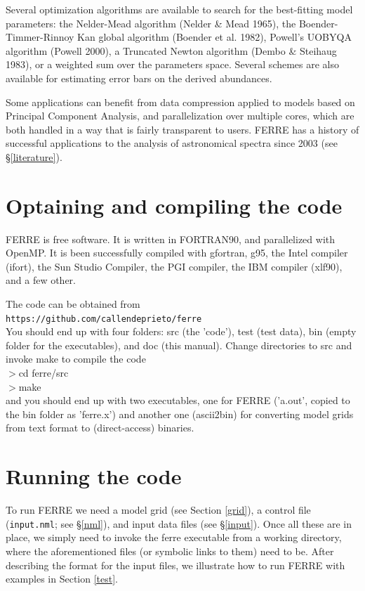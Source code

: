 \documentclass[12pt]{article}
\begin{document}
Several optimization algorithms are available to search for the 
best-fitting model parameters: 
the Nelder-Mead algorithm (Nelder \& Mead 1965), 
the  Boender-Timmer-Rinnoy Kan global algorithm (Boender et al. 1982), 
Powell's UOBYQA algorithm (Powell 2000), 
a Truncated Newton algorithm (Dembo \& Steihaug 1983), 
or a weighted sum over the parameters space. Several schemes are also available 
for estimating error bars on the derived abundances. 

Some applications can benefit from data compression applied to models based on 
Principal Component Analysis, and parallelization
over multiple cores, which are both handled in a way that is
fairly transparent to users.
FERRE has a history of successful applications to the analysis of
astronomical spectra since 2003 (see \S \ref{literature}).

\section{Optaining and compiling the code}
\label{compiling}

FERRE is free software. It is written in FORTRAN90, and parallelized
with OpenMP. It is been successfully compiled with gfortran, g95, 
the Intel compiler (ifort), the  Sun Studio Compiler, the PGI compiler, 
the IBM compiler (xlf90), and a few other.

The code can be obtained from \\
{\tt https://github.com/callendeprieto/ferre} \\
You should end up with four
folders: src (the 'code'), test (test data), bin (empty folder for the executables), 
and doc (this manual). Change directories to src and invoke
make to compile the code  \\
$>$cd  ferre/src \\
$>$make  \\
\noindent and you should end up with two executables, 
one for FERRE ('a.out', copied to the bin folder as 'ferre.x') and 
another one (ascii2bin) for  converting model grids from text
format to (direct-access) binaries.

\section{Running the code}
\label{running}

To run FERRE we need a model grid (see Section \ref{grid}), a control
file ({\tt input.nml}; see \S \ref{nml}), 
and input data files (see \S \ref{input}).
Once all these are in place, we simply need to invoke the ferre executable
from a working directory, where the aforementioned files 
(or symbolic links to them) need to be. After describing the format 
for the input files, we illustrate how to run FERRE with examples
in Section \ref{test}.
\end{document}
